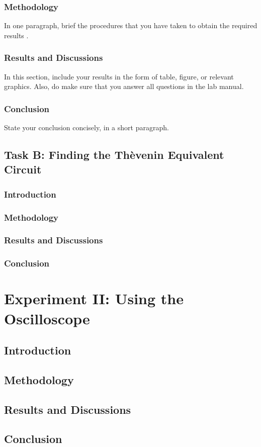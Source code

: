 \documentclass[11pt]{article}
\begin{document}
\subsubsection{Methodology}
In one paragraph, brief the procedures that you have taken to obtain the required results \cite{1292241}.

\subsubsection{Results and Discussions}
In this section, include your results in the form of table, figure, or relevant graphics.  Also, do make sure that you answer all questions in the lab manual. 

\subsubsection{Conclusion}
State your conclusion concisely, in a short paragraph.

\subsection{Task B: Finding the Th\`{e}venin Equivalent Circuit}
\subsubsection{Introduction}

\subsubsection{Methodology}


\subsubsection{Results and Discussions}

\subsubsection{Conclusion}


\newpage

\section{Experiment II: Using the Oscilloscope}

\subsection{Introduction}

\subsection{Methodology}

\subsection{Results and Discussions}

\subsection{Conclusion}





\end{document}
